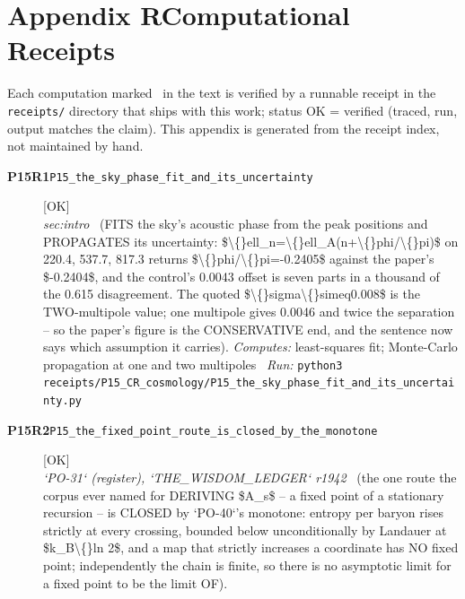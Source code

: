 \clearpage
\section*{Appendix R\quad Computational Receipts}\label{app:receipts}
\small\noindent Each computation marked \rcptmarker\ in the text is verified by a runnable receipt in the \texttt{receipts/} directory that ships with this work; status \textsf{OK} = verified (traced, run, output matches the claim). This appendix is generated from the receipt index, not maintained by hand.\par\medskip
\begingroup\renewcommand{\arraystretch}{1.25}
\begin{description}
\item[\textbf{P15R1}\quad\texttt{P15\_the\_sky\_phase\_fit\_and\_its\_uncertainty}]\hfill\textsf{[OK]}\\
\textit{sec:intro} \ (FITS the sky's acoustic phase from the peak positions and PROPAGATES its uncertainty: \$\textbackslash\{\}ell\_n=\textbackslash\{\}ell\_A(n+\textbackslash\{\}phi/\textbackslash\{\}pi)\$ on 220.4, 537.7, 817.3 returns \$\textbackslash\{\}phi/\textbackslash\{\}pi=-0.2405\$ against the paper's \$-0.2404\$, and the control's 0.0043 offset is seven parts in a thousand of the 0.615 disagreement.  The quoted \$\textbackslash\{\}sigma\textbackslash\{\}simeq0.008\$ is the TWO-multipole value; one multipole gives 0.0046 and twice the separation -- so the paper's figure is the CONSERVATIVE end, and the sentence now says which assumption it carries). 
\emph{Computes:} least-squares fit; Monte-Carlo propagation at one and two multipoles
\ \emph{Run:} \texttt{python3 receipts/P15\_CR\_cosmology/P15\_the\_sky\_phase\_fit\_and\_its\_uncertainty.py}
\item[\textbf{P15R2}\quad\texttt{P15\_the\_fixed\_point\_route\_is\_closed\_by\_the\_monotone}]\hfill\textsf{[OK]}\\
\textit{`PO-31` (register), `THE\_WISDOM\_LEDGER` r1942} \ (the one route the corpus ever named for DERIVING \$A\_s\$ -- a fixed point of a stationary recursion -- is CLOSED by `PO-40`'s monotone: entropy per baryon rises strictly at every crossing, bounded below unconditionally by Landauer at \$k\_B\textbackslash\{\}ln 2\$, and a map that strictly increases a coordinate has NO fixed point; independently the chain is finite, so there is no asymptotic limit for a fixed point to be the limit OF). 

\end{description}
